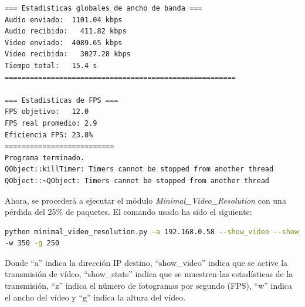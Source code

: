 \begin{lstlisting}[language=bash,basicstyle=\ttfamily\scriptsize]
=== Estadisticas globales de ancho de banda ===
Audio enviado:	1101.04 kbps
Audio recibido:   411.82 kbps
Video enviado:	4089.65 kbps
Video recibido:   3027.28 kbps
Tiempo total: 	15.4 s
=======================================================

=== Estadisticas de FPS ===
FPS objetivo: 	12.0
FPS real promedio: 2.9
Eficiencia FPS:	23.8%
==========================
Programa terminado.
QObject::killTimer: Timers cannot be stopped from another thread
QObject::~QObject: Timers cannot be stopped from another thread
\end{lstlisting}
\vspace{\baselineskip}

\newpage

Ahora, se procederá a ejecutar el módulo \textit{Minimal\_Video\_Resolution} con una pérdida del 25\% de paquetes. El comando usado ha sido el siguiente:

\begin{lstlisting}[language=bash,basicstyle=\ttfamily\scriptsize]
python minimal_video_resolution.py -a 192.168.0.58 --show_video --show_stats -z 12 \\
-w 350 -g 250
\end{lstlisting}
Donde ``a'' indica la dirección IP destino, ``show\_video'' indica que se active la transmisión de vídeo, ``show\_stats'' indica que se muestren las estadísticas de la transmisión, ``z'' indica el número de fotogramas por segundo (FPS), ``w'' indica el ancho del vídeo y ``g'' indica la altura del vídeo.
\vspace{\baselineskip}

